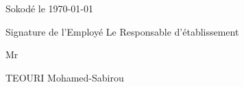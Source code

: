 \documentclass[a4paper, 12pt]{article}
\begin{document}
\begin{flushright}
Sokodé le \today
\end{flushright}\vspace{2mm}



Signature de l'Employé \hspace{6.3cm}  Le Responsable d'établissement


\vspace{3cm}



\begin{minipage}[t]{0.5\textwidth} %
\raggedright %
Mr  
\end{minipage} %
\hfill %
\begin{minipage}[t]{0.4\textwidth} %
\raggedleft %
TEOURI Mohamed-Sabirou  
  
\end{minipage} %
\end{document}
